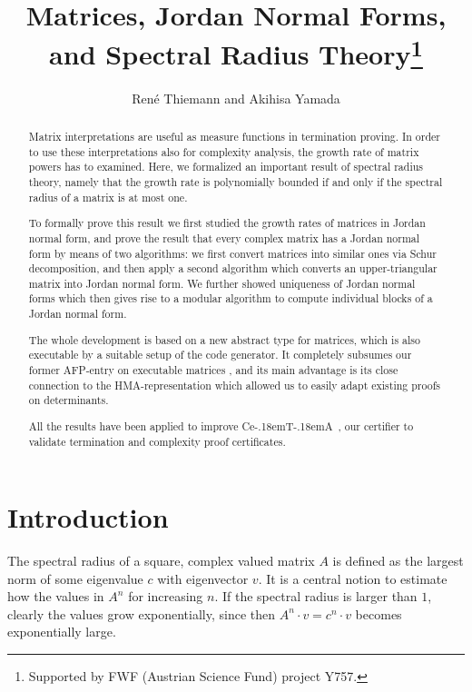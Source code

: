 \documentclass[11pt,a4paper]{article}
\newcommand\ceta{\textsf{Ce\kern-.18emT\kern-.18emA}}
\begin{document}
\title{Matrices, Jordan Normal Forms, and Spectral Radius Theory\footnote{Supported by FWF (Austrian Science Fund) project Y757.}}
\author{Ren\'e Thiemann and Akihisa Yamada}
\maketitle

\begin{abstract}
  Matrix interpretations are useful as measure functions in termination proving.
  In order to use these interpretations also for complexity analysis, 
  the growth rate of matrix powers has to examined. Here, we formalized
  an important result of spectral radius theory, namely that the growth rate
  is polynomially bounded if and only if the spectral radius of a matrix is at most one. 
  
  To formally prove this result we first studied the growth rates of matrices
  in Jordan normal form, and prove the result that every 
  complex matrix has a Jordan normal form by means of two algorithms:
  we first convert matrices into similar ones via Schur decomposition, and
  then apply a second algorithm which converts an upper-triangular matrix into
  Jordan normal form. We further showed uniqueness of Jordan normal forms which 
  then gives rise to a modular algorithm to compute individual blocks of a Jordan
  normal form. 
  
  The whole development is based on a new abstract type for matrices, which is
  also executable by a suitable setup of the code generator. It 
  completely subsumes our former AFP-entry on executable matrices 
  \cite{Matrix-AFP}, and its main advantage is its close connection to the
  HMA-representation which allowed us to easily adapt existing proofs on 
  determinants.
  
 All the results have been applied to improve \ceta\ \cite{CeTA,CeTAcomplexity},
 our certifier to validate termination and complexity proof certificates.
\end{abstract}

\tableofcontents

\section{Introduction}

The spectral radius of a square, complex valued matrix $A$ is defined as the 
largest norm of some eigenvalue $c$ with eigenvector $v$. 
It is a central notion to estimate how
the values in $A^n$ for increasing $n$. If the spectral radius is larger
than $1$, clearly the values grow exponentially, since then 
$A^n \cdot v = c^n \cdot v$ becomes exponentially large. 
\end{document}
